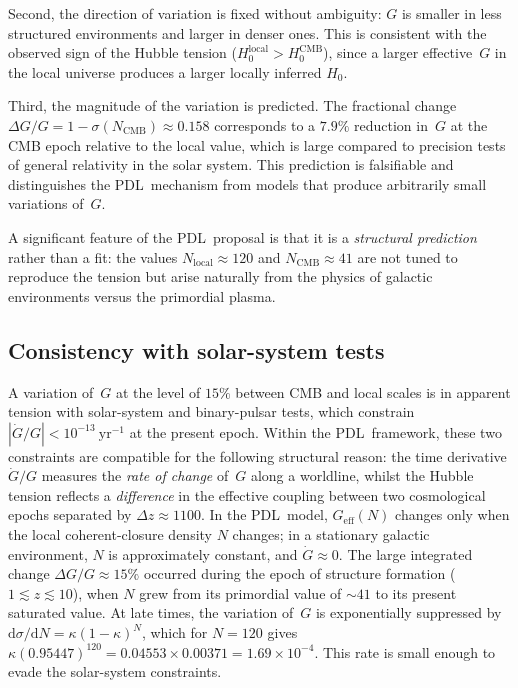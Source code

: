 \documentclass[11pt,a4paper]{article}
\theoremstyle{definition}
\newcommand{\PDL}{\textnormal{PDL}}
\newcommand{\Geff}{G_{\mathrm{eff}}}
\newcommand{\Hzero}{H_0}
\newcommand{\kap}{\kappa}
\newcommand{\sig}{\sigma}
\begin{document}
Second, the direction of variation is fixed without ambiguity: $G$ is smaller in less structured environments and larger in denser ones. This is consistent with the observed sign of the Hubble tension ($\Hzero^{\mathrm{local}} > \Hzero^{\mathrm{CMB}}$), since a larger effective~$G$ in the local universe produces a larger locally inferred $\Hzero$.

Third, the magnitude of the variation is predicted. The fractional change $\Delta G/G = 1 - \sig(N_{\mathrm{CMB}}) \approx 0.158$ corresponds to a $7.9\%$ reduction in~$G$ at the CMB epoch relative to the local value, which is large compared to precision tests of general relativity in the solar system. This prediction is falsifiable and distinguishes the \PDL\ mechanism from models that produce arbitrarily small variations of~$G$.

A significant feature of the \PDL\ proposal is that it is a \emph{structural prediction} rather than a fit: the values $N_{\mathrm{local}} \approx 120$ and $N_{\mathrm{CMB}} \approx 41$ are not tuned to reproduce the tension but arise naturally from the physics of galactic environments versus the primordial plasma.

\subsection{Consistency with solar-system tests}
\label{subsec:solar}

A variation of~$G$ at the level of $15\%$ between CMB and local scales is in apparent tension with solar-system and binary-pulsar tests, which constrain $|\dot{G}/G| < 10^{-13}\ \mathrm{yr}^{-1}$ at the present epoch.\cite{Uzan_2003} Within the \PDL\ framework, these two constraints are compatible for the following structural reason: the time derivative $\dot{G}/G$ measures the \emph{rate of change} of~$G$ along a worldline, whilst the Hubble tension reflects a \emph{difference} in the effective coupling between two cosmological epochs separated by $\Delta z \approx 1100$. In the \PDL\ model, $\Geff(N)$ changes only when the local coherent-closure density $N$ changes; in a stationary galactic environment, $N$ is approximately constant, and $\dot{G} \approx 0$. The large integrated change $\Delta G/G \approx 15\%$ occurred during the epoch of structure formation ($1 \lesssim z \lesssim 10$), when $N$ grew from its primordial value of $\sim 41$ to its present saturated value. At late times, the variation of~$G$ is exponentially suppressed by $\mathrm{d}\sig/\mathrm{d}N = \kap(1-\kap)^N$, which for $N = 120$ gives $\kap(0.95447)^{120} = 0.04553 \times 0.00371 = 1.69 \times 10^{-4}$. This rate is small enough to evade the solar-system constraints.\cite{Uzan_2003}
\end{document}
